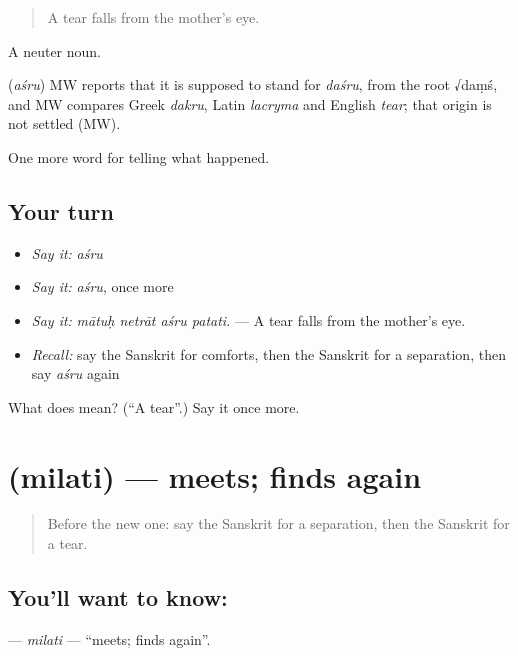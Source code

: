 \begin{quote}
A tear falls from the mother's eye.
\end{quote}

A neuter noun.

\begin{cousinweb}
\textbf{} (\emph{aśru}) MW reports that it is supposed to stand for \emph{daśru}, from the root √daṃś, and MW compares Greek \emph{dakru}, Latin \emph{lacryma} and English \emph{tear}; that origin is not settled (MW).
\end{cousinweb}

\begin{grammarlens}[title={What you've built}]
One more word for telling what happened.
\end{grammarlens}

\subsection*{Your turn}
\begin{itemize}
\raggedright
  \item \emph{Say it:} \emph{aśru}
  \item \emph{Say it:} \emph{aśru}, once more
  \item \emph{Say it:} \emph{mātuḥ netrāt aśru patati.} — A tear falls from the mother's eye.
  \item \emph{Recall:} say the Sanskrit for comforts, then the Sanskrit for a separation, then say \emph{aśru} again
\end{itemize}

\begin{tcolorbox}[breakable,colback=teal!4,colframe=teal!35!black,title={Before you move on}]
What does  mean? (\textquotedblleft{}A tear\textquotedblright{}.) Say it once more.
\end{tcolorbox}
\section[\texorpdfstring{\sk{मिलति} (milati)}{मिलति (milati)}]{ (milati) — meets; finds again}

\label{lesson:SA-C307-milati}



\begin{quote}
Before the new one: say the Sanskrit for a separation, then the Sanskrit for a tear.
\end{quote}

\subsection*{You'll want to know: }
\textbf{} — \emph{milati} — \textquotedblleft{}meets; finds again\textquotedblright{}.

